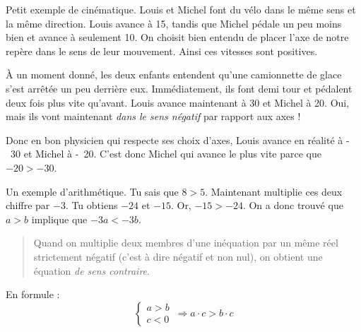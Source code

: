 Petit exemple de cinématique. Louis et Michel font du vélo dans le même sens et la même direction. Louis avance à \unit{15}{\kilo\meter\per\hour}, tandis que Michel pédale un peu moins bien et avance à seulement \unit{10}{\kilo\meter\per\hour}. On choisit bien entendu de placer l'axe de notre repère dans le sens de leur mouvement. Ainsi ces vitesses sont positives.

À un moment donné, les deux enfants entendent qu'une camionnette de glace s'est arrêtée un peu derrière eux. Immédiatement, ils font demi tour et pédalent deux fois plus vite qu'avant. Louis avance maintenant à \unit{30}{\kilo\meter\per\hour} et Michel à \unit{20}{\kilo\meter\per\hour}. Oui, mais ils vont maintenant \emph{dans le sens négatif} par rapport aux axes !

Donc en bon physicien qui respecte ses choix d'axes, Louis avance en réalité à \unit{-30}{\kilo\meter\per\hour} et Michel à \unit{-20}{\kilo\meter\per\hour}. C'est donc Michel qui avance le plus vite parce que $-20 > -30$.


Un exemple d'arithmétique. Tu sais que $8 > 5$. Maintenant multiplie ces deux chiffre par $-3$. Tu obtiens $-24$ et $-15$. Or, $-15>-24$. On a donc trouvé que $a>b$ implique que $-3a<-3b$.

\begin{quote}
Quand on multiplie deux membres d'une inéquation par un même réel strictement négatif (c'est à dire négatif et non nul), on obtient une équation \emph{de sens contraire}.
\end{quote}
En formule :
\[
\left\{ 
\begin{matrix}
a>b\\
c<0
\end{matrix}
\right.\,
\Longrightarrow
 a\cdot c>b\cdot c
\]







